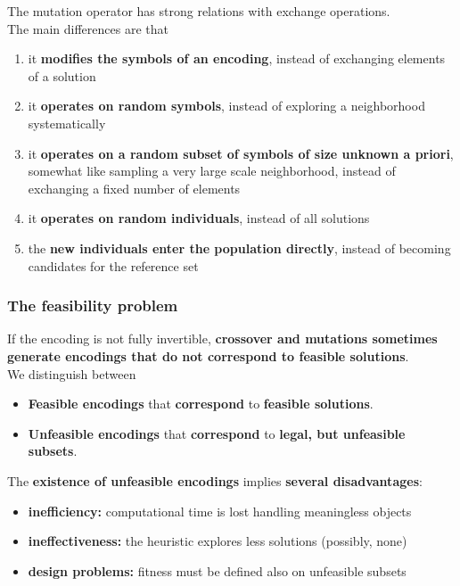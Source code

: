 The mutation operator has strong relations with exchange operations.\\
The main differences are that
\begin{enumerate}
	\item it \textbf{modifies the symbols of an encoding}, instead of exchanging elements of a solution
	\item it \textbf{operates on random symbols}, instead of exploring a neighborhood systematically
	\item it \textbf{operates on a random subset of symbols of size unknown a priori}, somewhat like sampling a very large scale neighborhood, instead of exchanging a fixed number of elements
	\item it \textbf{operates on random individuals}, instead of all solutions
	\item the \textbf{new individuals enter the population directly}, instead of becoming candidates for the reference set
\end{enumerate}

\newpage

\subsubsection{The feasibility problem}
If the encoding is not fully invertible, \textbf{crossover and mutations sometimes generate encodings that do not correspond to feasible solutions}.\\

We distinguish between
\begin{itemize}
	\item \textbf{Feasible encodings} that \textbf{correspond} to \textbf{feasible solutions}.\\
	
	\item \textbf{Unfeasible encodings} that \textbf{correspond} to \textbf{legal, but unfeasible subsets}.\\
\end{itemize}

The \textbf{existence of unfeasible encodings} implies \textbf{several disadvantages}:
\begin{itemize}
	\item \textbf{inefficiency:} computational time is lost handling meaningless objects
	\item \textbf{ineffectiveness:} the heuristic explores less solutions (possibly, none)
	\item \textbf{design problems:} fitness must be defined also on unfeasible subsets
\end{itemize}
\nn

